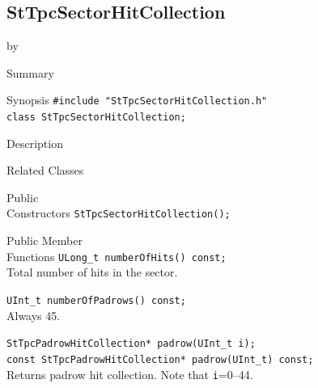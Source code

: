 \documentclass[twoside]{article}
\newcommand{\entrylabel}[1]{\mbox{\textbf{{#1}}}\hfil}%
\newenvironment{entry}
{\begin{list}{}%
    {\renewcommand{\makelabel}{\entrylabel}%
     \setlength{\labelwidth}{90pt}%
     \setlength{\leftmargin}{\labelwidth}
     \advance\leftmargin by \labelsep%
      }%
    }%
  {\end{list}}
\newcommand{\Entrylabel}[1]%
{\raisebox{0pt}[1ex][0pt]{\makebox[\labelwidth][l]%
    {\parbox[t]{\labelwidth}{\hspace{0pt}\textbf{{#1}}}}}}
\newenvironment{Entry}%
{\renewcommand{\entrylabel}{\Entrylabel}\begin{entry}}%
  {\end{entry}}
\begin{document}
\subsection{StTpcSectorHitCollection}
\label{sec:StTpcSectorHitCollection}
\begin{Entry}
\item[Summary]
\item[Synopsis]
    \verb+#include "StTpcSectorHitCollection.h"+\\
    \verb+class StTpcSectorHitCollection;+\\
\item[Description]
\item[Related Classes]
\item[Public\\ Constructors]
    \verb+StTpcSectorHitCollection();+\\
\item[Public Member\\ Functions]
    \verb+ULong_t numberOfHits() const;+\\
    Total number of hits in the sector.
    
    \verb+UInt_t numberOfPadrows() const;+\\
    Always 45.
    
    \verb+StTpcPadrowHitCollection* padrow(UInt_t i);+\\
    \verb+const StTpcPadrowHitCollection* padrow(UInt_t) const;+\\
    Returns padrow hit collection. Note that \texttt{i}=0--44.
    
\end{Entry}
\clearpage
\end{document}
